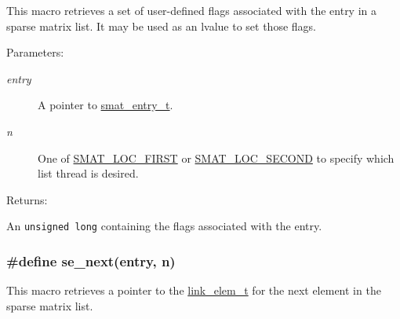 This macro retrieves a set of user-defined flags associated with the entry in a sparse matrix list. It may be used as an lvalue to set those flags.\begin{Desc}
\item[Parameters: ]\par
\begin{description}
\item[{\em 
entry}]A pointer to \hyperlink{group__dbprim__smat_a2}{smat\_\-entry\_\-t}. \item[{\em 
n}]One of \hyperlink{group__dbprim__smat_a48a136}{SMAT\_\-LOC\_\-FIRST} or \hyperlink{group__dbprim__smat_a48a137}{SMAT\_\-LOC\_\-SECOND} to specify which list thread is desired.\end{description}
\end{Desc}
\begin{Desc}
\item[Returns: ]\par
An {\tt unsigned long} containing the flags associated with the entry. \end{Desc}
\hypertarget{group__dbprim__smat_a44}{
\subsubsection[se\_\-next]{\setlength{\rightskip}{0pt plus 5cm}\#define se\_\-next(entry, n)}}
\label{group__dbprim__smat_a44}


This macro retrieves a pointer to the \hyperlink{group__dbprim__link_a1}{link\_\-elem\_\-t} for the next element in the sparse matrix list.

